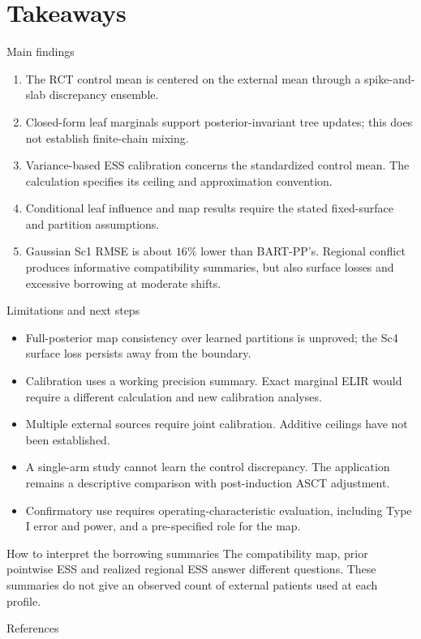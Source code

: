 \documentclass[11pt,aspectratio=169]{beamer}
\begin{document}
\section{Takeaways}
\begin{frame}{Main findings}
  \begin{enumerate}
    \item The RCT control mean is centered on the external mean through a spike-and-slab discrepancy ensemble.
    \item Closed-form leaf marginals support posterior-invariant tree updates; this does not establish finite-chain mixing.
    \item Variance-based ESS calibration concerns the standardized control mean. The calculation specifies its ceiling and approximation convention.
    \item Conditional leaf influence and map results require the stated fixed-surface and partition assumptions.
    \item Gaussian Sc1 RMSE is about $16\%$ lower than BART-PP's. Regional conflict produces informative compatibility summaries, but also surface losses and excessive borrowing at moderate shifts.
  \end{enumerate}
\end{frame}

\begin{frame}{Limitations and next steps}
  \begin{itemize}
    \item Full-posterior map consistency over learned partitions is unproved; the Sc4 surface loss persists away from the boundary.
    \item Calibration uses a working precision summary. Exact marginal ELIR would require a different calculation and new calibration analyses.
    \item Multiple external sources require joint calibration. Additive ceilings have not been established.
    \item A single-arm study cannot learn the control discrepancy. The application remains a descriptive comparison with post-induction ASCT adjustment.
    \item Confirmatory use requires operating-characteristic evaluation, including Type I error and power, and a pre-specified role for the map.
  \end{itemize}
  \begin{block}{How to interpret the borrowing summaries}
    The compatibility map, prior pointwise ESS and realized regional ESS answer different questions. These summaries do not give an observed count of external patients used at each profile.
  \end{block}
\end{frame}

\begin{frame}[allowframebreaks]{References}
  \fontsize{6.5pt}{7.4pt}\selectfont
  
  
\end{frame}
\end{document}
